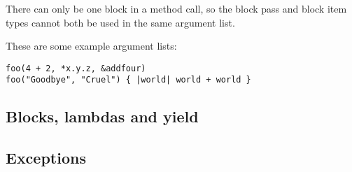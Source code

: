 There can only be one block in a method call, so the block pass and block item types cannot both be used in the same argument list.

These are some example argument lists:

\begin{lstlisting}
foo(4 + 2, *x.y.z, &addfour)
foo("Goodbye", "Cruel") { |world| world + world }
\end{lstlisting}

\subsection{Blocks, lambdas and yield}

\subsection{Exceptions}
